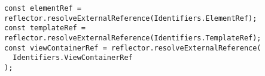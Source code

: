 \begin{verbatim}
const elementRef = reflector.resolveExternalReference(Identifiers.ElementRef);
const templateRef = reflector.resolveExternalReference(Identifiers.TemplateRef);
const viewContainerRef = reflector.resolveExternalReference(
  Identifiers.ViewContainerRef
);
\end{verbatim}
